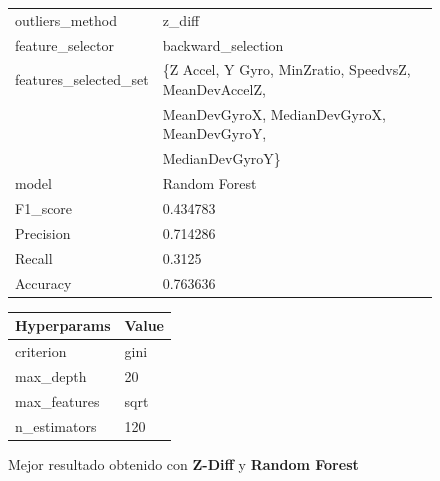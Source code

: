 \begin{appendices}
\begin{figure}[htb]
			\begin{tabular}{ll}
				\toprule
					  outliers\_method &                                             z\_diff \\
					 feature\_selector &                                 backward\_selection \\
				features\_selected\_set & \{Z Accel, Y Gyro, MinZratio, SpeedvsZ, MeanDevAccelZ, \\
                						& MeanDevGyroX, MedianDevGyroX, MeanDevGyroY,\\ 
										& MedianDevGyroY\} \\
								model &                                      Random Forest \\
							 F1\_score &                                           0.434783 \\
							Precision &                                           0.714286 \\
							   Recall &                                             0.3125 \\
							 Accuracy &                                           0.763636 \\
				\bottomrule
			\end{tabular}
			\newline
			\newline

			\begin{tabular}{ll}
				\toprule
				 Hyperparams & Value \\
				\midrule
				   criterion &  gini \\
				   max\_depth &    20 \\
				max\_features &  sqrt \\
				n\_estimators &   120 \\
				\bottomrule
			\end{tabular}
			\caption{Mejor resultado obtenido con \textbf{Z-Diff} y \textbf{Random Forest}}
			\label{table:34}

		\end{figure}


\end{appendices}
